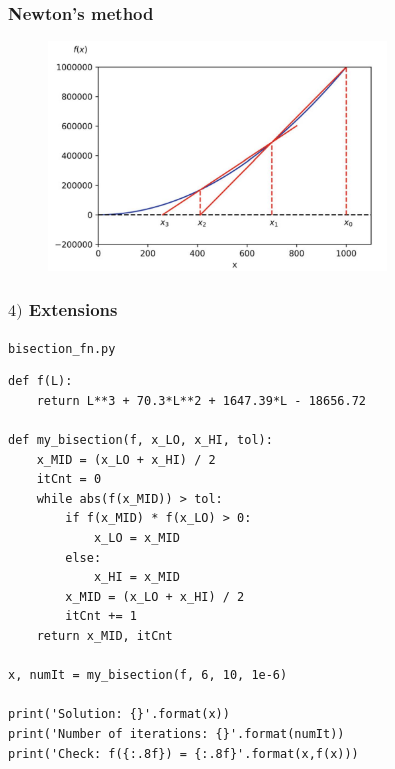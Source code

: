 \documentclass[english,14pt]{beamer}
\begin{document}

\begin{frame}[fragile]

\frametitle{Newton's method}

\begin{figure}[ht]
	\centering
	\includegraphics[width=0.8\textwidth]{figures/NewtonsMethod}
\end{figure}

\end{frame}


\begin{frame}[fragile]

\frametitle{$4)$ Extensions}

\texttt{bisection\_fn.py}
\begin{lstlisting}[style=CStyle,basicstyle=\scriptsize]
def f(L):
    return L**3 + 70.3*L**2 + 1647.39*L - 18656.72

def my_bisection(f, x_LO, x_HI, tol):
    x_MID = (x_LO + x_HI) / 2
    itCnt = 0
    while abs(f(x_MID)) > tol:
        if f(x_MID) * f(x_LO) > 0:
            x_LO = x_MID
        else:
            x_HI = x_MID
        x_MID = (x_LO + x_HI) / 2
        itCnt += 1
    return x_MID, itCnt

x, numIt = my_bisection(f, 6, 10, 1e-6)

print('Solution: {}'.format(x))
print('Number of iterations: {}'.format(numIt))
print('Check: f({:.8f}) = {:.8f}'.format(x,f(x)))
\end{lstlisting}

\end{frame}

\end{document}

